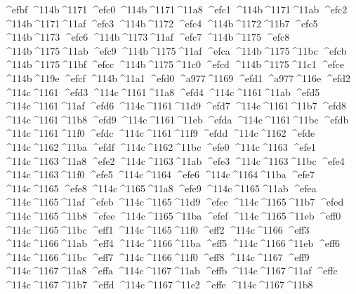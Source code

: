 \checkit ^^^^efbf ^^^^114b^^^^1171
\checkit ^^^^efc0 ^^^^114b^^^^1171^^^^11a8
\checkit ^^^^efc1 ^^^^114b^^^^1171^^^^11ab
\checkit ^^^^efc2 ^^^^114b^^^^1171^^^^11af
\checkit ^^^^efc3 ^^^^114b^^^^1172
\checkit ^^^^efc4 ^^^^114b^^^^1172^^^^11b7
\checkit ^^^^efc5 ^^^^114b^^^^1173
\checkit ^^^^efc6 ^^^^114b^^^^1173^^^^11af
\checkit ^^^^efc7 ^^^^114b^^^^1175
\checkit ^^^^efc8 ^^^^114b^^^^1175^^^^11ab
\checkit ^^^^efc9 ^^^^114b^^^^1175^^^^11af
\checkit ^^^^efca ^^^^114b^^^^1175^^^^11bc
\checkit ^^^^efcb ^^^^114b^^^^1175^^^^11bf
\checkit ^^^^efcc ^^^^114b^^^^1175^^^^11c0
\checkit ^^^^efcd ^^^^114b^^^^1175^^^^11c1
\checkit ^^^^efce ^^^^114b^^^^119e
\checkit ^^^^efcf ^^^^114b^^^^11a1
\checkit ^^^^efd0 ^^^^a977^^^^1169
\checkit ^^^^efd1 ^^^^a977^^^^116e
\checkit ^^^^efd2 ^^^^114c^^^^1161
\checkit ^^^^efd3 ^^^^114c^^^^1161^^^^11a8
\checkit ^^^^efd4 ^^^^114c^^^^1161^^^^11ab
\checkit ^^^^efd5 ^^^^114c^^^^1161^^^^11af
\checkit ^^^^efd6 ^^^^114c^^^^1161^^^^11d9
\checkit ^^^^efd7 ^^^^114c^^^^1161^^^^11b7
\checkit ^^^^efd8 ^^^^114c^^^^1161^^^^11b8
\checkit ^^^^efd9 ^^^^114c^^^^1161^^^^11eb
\checkit ^^^^efda ^^^^114c^^^^1161^^^^11bc
\checkit ^^^^efdb ^^^^114c^^^^1161^^^^11f0
\checkit ^^^^efdc ^^^^114c^^^^1161^^^^11f9
\checkit ^^^^efdd ^^^^114c^^^^1162
\checkit ^^^^efde ^^^^114c^^^^1162^^^^11ba
\checkit ^^^^efdf ^^^^114c^^^^1162^^^^11bc
\checkit ^^^^efe0 ^^^^114c^^^^1163
\checkit ^^^^efe1 ^^^^114c^^^^1163^^^^11a8
\checkit ^^^^efe2 ^^^^114c^^^^1163^^^^11ab
\checkit ^^^^efe3 ^^^^114c^^^^1163^^^^11bc
\checkit ^^^^efe4 ^^^^114c^^^^1163^^^^11f0
\checkit ^^^^efe5 ^^^^114c^^^^1164
\checkit ^^^^efe6 ^^^^114c^^^^1164^^^^11ba
\checkit ^^^^efe7 ^^^^114c^^^^1165
\checkit ^^^^efe8 ^^^^114c^^^^1165^^^^11a8
\checkit ^^^^efe9 ^^^^114c^^^^1165^^^^11ab
\checkit ^^^^efea ^^^^114c^^^^1165^^^^11af
\checkit ^^^^efeb ^^^^114c^^^^1165^^^^11d9
\checkit ^^^^efec ^^^^114c^^^^1165^^^^11b7
\checkit ^^^^efed ^^^^114c^^^^1165^^^^11b8
\checkit ^^^^efee ^^^^114c^^^^1165^^^^11ba
\checkit ^^^^efef ^^^^114c^^^^1165^^^^11eb
\checkit ^^^^eff0 ^^^^114c^^^^1165^^^^11bc
\checkit ^^^^eff1 ^^^^114c^^^^1165^^^^11f0
\checkit ^^^^eff2 ^^^^114c^^^^1166
\checkit ^^^^eff3 ^^^^114c^^^^1166^^^^11ab
\checkit ^^^^eff4 ^^^^114c^^^^1166^^^^11ba
\checkit ^^^^eff5 ^^^^114c^^^^1166^^^^11eb
\checkit ^^^^eff6 ^^^^114c^^^^1166^^^^11bc
\checkit ^^^^eff7 ^^^^114c^^^^1166^^^^11f0
\checkit ^^^^eff8 ^^^^114c^^^^1167
\checkit ^^^^eff9 ^^^^114c^^^^1167^^^^11a8
\checkit ^^^^effa ^^^^114c^^^^1167^^^^11ab
\checkit ^^^^effb ^^^^114c^^^^1167^^^^11af
\checkit ^^^^effc ^^^^114c^^^^1167^^^^11b7
\checkit ^^^^effd ^^^^114c^^^^1167^^^^11e2
\checkit ^^^^effe ^^^^114c^^^^1167^^^^11b8
